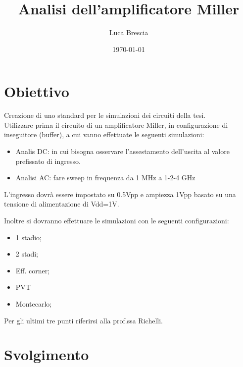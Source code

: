 \documentclass[a4paper]{article}
\begin{document}
    
    \title{Analisi dell'amplificatore Miller}
    \author{Luca Brescia}
    \date{\today}
    \maketitle

    \section*{Obiettivo}
        Creazione di uno standard per le simulazioni dei circuiti della tesi. \\
        Utilizzare prima il circuito di un amplificatore Miller, in configurazione di inseguitore (buffer), a cui vanno effettuate le seguenti simulazioni:

        \begin{itemize}
            \item Analis DC: in cui bisogna osservare l'assestamento dell'uscita al valore prefissato di ingresso.
            \item Analisi AC: fare sweep in frequenza da 1 MHz a 1-2-4 GHz
        \end{itemize}

        L'ingresso dovrà essere impostato su 0.5Vpp e ampiezza 1Vpp basato su una tensione di alimentazione di Vdd=1V.

        Inoltre si dovranno effettuare le simulazioni con le seguenti configurazioni:

        \begin{itemize}
            \item 1 stadio;
            \item 2 stadi;
            \item Eff. corner;
            \item PVT
            \item Montecarlo;
        \end{itemize}

        Per gli ultimi tre punti riferirsi alla prof.ssa Richelli.
    \section*{Svolgimento}
\end{document}
